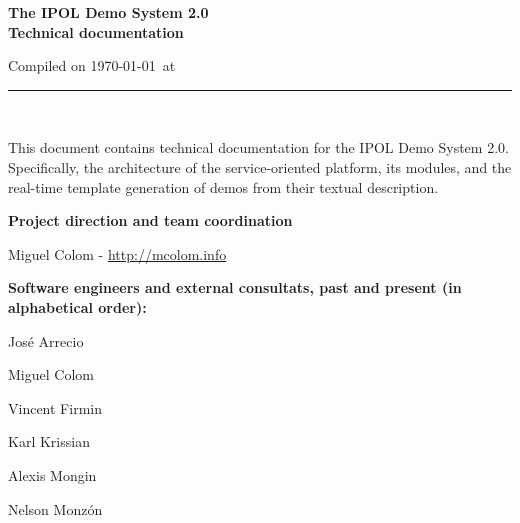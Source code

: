 \documentclass[a4paper,12pt]{article}
\begin{document}
\begin{titlepage}

\begin{center}
\vspace*{-1in}

\vspace*{0.6in}
\begin{Large}
\textbf{The IPOL Demo System 2.0 \\Technical documentation} \\
\end{Large}

\vspace*{0.6in}

\small{Compiled on \today\ at \currenttime}

\vspace*{0.6in}
\rule{80mm}{0.1mm}\\
\vspace*{0.1in}
\end{center}

\end{titlepage}

This document contains technical documentation for the IPOL Demo System 2.0. Specifically, the architecture of the service-oriented platform, its modules, and the real-time template generation of demos from their textual description.
\vspace*{0.6in}

\textbf{Project direction and team coordination}

Miguel Colom - \url{http://mcolom.info}

\vspace*{0.2in}

\textbf{Software engineers and external consultats, past and present (in alphabetical order):}


José Arrecio

Miguel Colom

Vincent Firmin

Karl Krissian

Alexis Mongin

Nelson Monzón


\newpage

\tableofcontents
\newpage
\listoffigures
\newpage


\end{document}
